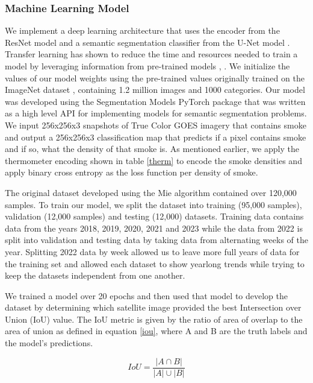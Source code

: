 \documentclass{ametsocV6.1}
\begin{document}
\subsubsection*{Machine Learning Model} 

We implement a deep learning architecture that uses the encoder from the ResNet model \citep{resnet} and a semantic segmentation classifier from the U-Net model \citep{unet}. Transfer learning has shown to reduce the time and resources needed to train a model by leveraging information from pre-trained models \citep{transfer}, \citep{transfer2}.  We initialize the values of our model weights using the pre-trained values originally trained on the ImageNet dataset \citep{imgnet}, containing 1.2 million images and 1000 categories. Our model was developed using the Segmentation Models PyTorch package \citep{semantic} that was written as a high level API for implementing models for semantic segmentation problems.  We input 256x256x3 snapshots of True Color GOES imagery that contains smoke and output a 256x256x3 classification map that predicts if a pixel contains smoke and if so, what the density of that smoke is. As mentioned earlier, we apply the thermometer encoding shown in table \ref{therm} to encode the smoke densities and apply binary cross entropy as the loss function per density of smoke. 

The original dataset developed using the Mie algorithm contained over 120,000 samples. To train our model, we split the dataset into training (95,000 samples), validation (12,000 samples) and testing (12,000) datasets. Training data contains data from the years 2018, 2019, 2020, 2021 and 2023 while the data from 2022 is split into validation and testing data by taking data from alternating weeks of the year. Splitting 2022 data by week allowed us to leave more full years of data for the training set and allowed each dataset to show yearlong trends while trying to keep the datasets independent from one another.

We trained a model over 20 epochs and then used that model to develop the dataset by determining which satellite image provided the best Intersection over Union (IoU) value. The IoU metric is given by the ratio of area of overlap to the area of union as defined in equation \ref{iou}, where A and B are the truth labels and the model's predictions.

\begin{equation} \label{iou}
    IoU = \frac{| A \cap B|}{|A|\cup|B|}
\end{equation}
\end{document}
